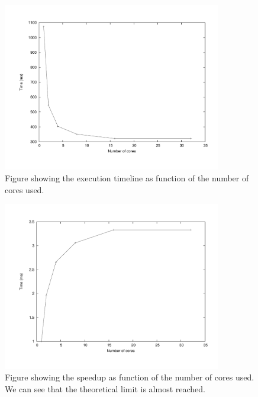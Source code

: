 \documentclass[a4paper,11pt]{article}
\begin{document}
\begin{enumerate}
  \begin{figure}[!h]
    \begin{center}
    \includegraphics[width=0.85\textwidth]{3dfft/processors_time_ms.pdf}
    \caption{Figure showing the execution timeline as function of the
      number of cores used.}
    \end{center}
  \end{figure}

  \begin{figure}[!h]
    \begin{center}
      \includegraphics[width=0.85\textwidth]{3dfft/processors_speedup.pdf}
    \caption{Figure showing the speedup as function of the number of
      cores used. We can see that the theoretical limit is almost
      reached.}
    \end{center}
  \end{figure}


\end{enumerate}
\end{document}

